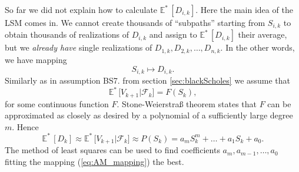 \documentclass[a4paper,12pt, oneside]{book}
\theoremstyle{definition}
\theoremstyle{remark}
\def\Em{{\mathbb{E}^*}\,}
\begin{document}
So far we did not explain how to calculate $\Em[D_{i,k}]$. Here the main idea of the LSM comes in. We cannot create thousands of ``subpaths'' starting from $S_{i,k}$ to obtain thousands of realizations of $D_{i,k}$ and assign to $\Em[D_{i,k}]$ their average, but we \emph{already have} single realizations of $D_{1,k}, D_{2,k},\ldots, D_{n,k}$. In the other words, we have mapping
\begin{equation}
 \label{eq:AM_mapping}
  S_{i,k} \mapsto D_{i,k}.
\end{equation}
Similarly as in assumption BS7. from section \ref{sec:blackScholes} we assume that
\begin{equation*}
 \Em\bigl[ V_{k+1} | \mathcal{F}_{k} \bigr] = F(S_{k}),
\end{equation*}
for some continuous function $F$. Stone-Weierstra\ss{} theorem states that $F$ can be approximated as closely as desired by a polynomial of a sufficiently large degree $m$. Hence
\begin{equation*}
 \Em[D_{k}] \approx \Em\bigl[ V_{k+1} | \mathcal{F}_{k} \bigr] \approx P(S_{k}) = a_m S_{k}^m + \ldots + a_1 S_{k} + a_0.
\end{equation*}
The method of least squares can be used to find coefficients $a_m, a_{m-1},\ldots,a_0$ fitting the mapping (\ref{eq:AM_mapping}) the best.
\end{document}
